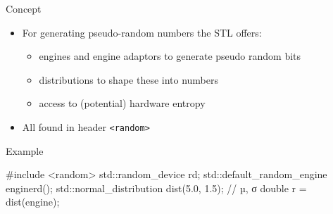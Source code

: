 
\begin{frame}[fragile]
  \begin{block}{Concept}
    \begin{itemize}
      \item For generating pseudo-random numbers the STL offers:
      \begin{itemize}
        \item engines and engine adaptors to generate pseudo random bits
        \item distributions to shape these into numbers
        \item access to (potential) hardware entropy
      \end{itemize}
      \item All found in header \texttt{<random>}
    \end{itemize}
  \end{block}
  \begin{exampleblock}{Example}
    \begin{cppcode}
      #include <random>
      std::random_device rd;
      std::default_random_engine engine{rd()};
      std::normal_distribution dist(5.0, 1.5); // µ, σ
      double r = dist(engine);
    \end{cppcode}
  \end{exampleblock}
\end{frame}

